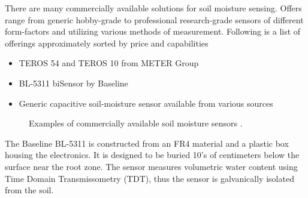 
There are many commercially available solutions for soil moisture sensing. Offers range from generic hobby-grade to professional research-grade sensors of different form-factors and utilizing various methods of measurement. Following is a list of offerings approximately sorted by price and capabilities
\begin{itemize}
    \item TEROS 54 and TEROS 10 from METER Group \cite{meter_group_teros_2024, meter_group_teros_nodate}
    \item BL-5311 biSensor by Baseline \cite{baseline_soil_2021}
    \item Generic capacitive soil-moisture sensor available from various sources \cite{czechproject_spol_sro_pudni_2024}
\end{itemize}

\begin{figure}
    \centering
    \caption{\label{fig:soil-sensors}Examples of commercially available soil moisture sensors \cite{meter_group_teros_nodate, baseline_soil_2021, czechproject_spol_sro_pudni_2024}.}
\end{figure}

The Baseline BL-5311 is constructed from an FR4 material and a plastic box housing the electronics. It is designed to be buried 10's of centimeters below the surface near the root zone. The sensor measures volumetric water content using Time Domain Transmissometry (TDT), thus the sensor is galvanically isolated from the soil.

